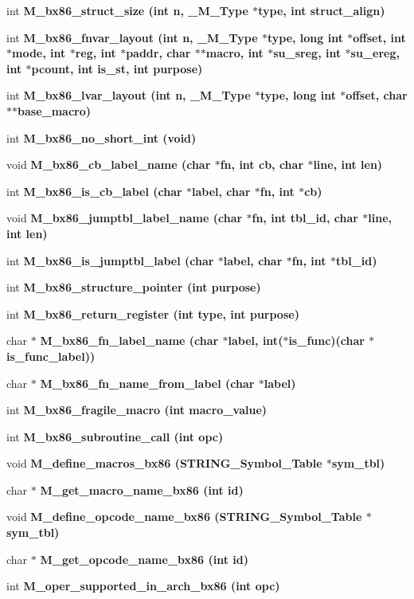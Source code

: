 \begin{CompactItemize}
\item 
int \bf{M\_\-bx86\_\-struct\_\-size} (int n, \bf{\_\-M\_\-Type} $\ast$type, int struct\_\-align)
\item 
int \bf{M\_\-bx86\_\-fnvar\_\-layout} (int n, \bf{\_\-M\_\-Type} $\ast$type, long int $\ast$offset, int $\ast$\bf{mode}, int $\ast$reg, int $\ast$paddr, char $\ast$$\ast$macro, int $\ast$su\_\-sreg, int $\ast$su\_\-ereg, int $\ast$pcount, int is\_\-st, int purpose)
\item 
int \bf{M\_\-bx86\_\-lvar\_\-layout} (int n, \bf{\_\-M\_\-Type} $\ast$type, long int $\ast$offset, char $\ast$$\ast$base\_\-macro)
\item 
int \bf{M\_\-bx86\_\-no\_\-short\_\-int} (void)
\item 
void \bf{M\_\-bx86\_\-cb\_\-label\_\-name} (char $\ast$fn, int cb, char $\ast$line, int len)
\item 
int \bf{M\_\-bx86\_\-is\_\-cb\_\-label} (char $\ast$label, char $\ast$fn, int $\ast$cb)
\item 
void \bf{M\_\-bx86\_\-jumptbl\_\-label\_\-name} (char $\ast$fn, int tbl\_\-id, char $\ast$line, int len)
\item 
int \bf{M\_\-bx86\_\-is\_\-jumptbl\_\-label} (char $\ast$label, char $\ast$fn, int $\ast$tbl\_\-id)
\item 
int \bf{M\_\-bx86\_\-structure\_\-pointer} (int purpose)
\item 
int \bf{M\_\-bx86\_\-return\_\-register} (int type, int purpose)
\item 
char $\ast$ \bf{M\_\-bx86\_\-fn\_\-label\_\-name} (char $\ast$label, int($\ast$is\_\-func)(char $\ast$is\_\-func\_\-label))
\item 
char $\ast$ \bf{M\_\-bx86\_\-fn\_\-name\_\-from\_\-label} (char $\ast$label)
\item 
int \bf{M\_\-bx86\_\-fragile\_\-macro} (int macro\_\-value)
\item 
int \bf{M\_\-bx86\_\-subroutine\_\-call} (int opc)
\item 
void \bf{M\_\-define\_\-macros\_\-bx86} (\bf{STRING\_\-Symbol\_\-Table} $\ast$sym\_\-tbl)
\item 
char $\ast$ \bf{M\_\-get\_\-macro\_\-name\_\-bx86} (int id)
\item 
void \bf{M\_\-define\_\-opcode\_\-name\_\-bx86} (\bf{STRING\_\-Symbol\_\-Table} $\ast$sym\_\-tbl)
\item 
char $\ast$ \bf{M\_\-get\_\-opcode\_\-name\_\-bx86} (int id)
\item 
int \bf{M\_\-oper\_\-supported\_\-in\_\-arch\_\-bx86} (int opc)

\end{CompactItemize}
